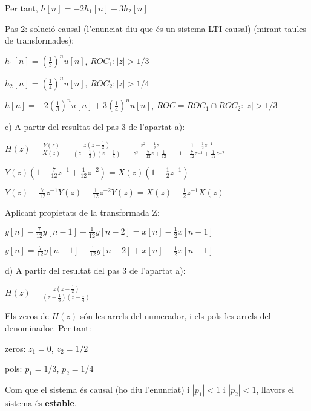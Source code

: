 \documentclass{article}
\begin{document}
\begin{description}
\begin{description}
Per tant, $h[n]=-2h_1[n]+3h_2[n]$

\item{Pas 2:}   solució causal (l'enunciat diu que és un sistema LTI causal) (mirant taules de transformades):

$
\displaystyle
h_1[n]=\left(\frac{1}{3}\right)^n u[n]
$, $ROC_1:|z|>1/3$

$
\displaystyle
h_2[n]=\left( \frac{1}{4} \right)^n u[n]
$, $ROC_2:|z|>1/4$

$
\displaystyle
h[n]=-2 \left(\frac{1}{3}\right)^n u[n] + 3 \left( \frac{1}{4} \right)^n u[n]
$, $ROC=ROC_1 \cap ROC_2:|z|>1/3$

\end{description}

\item{c)} A partir del resultat del pas 3 de l'apartat a):

$
\displaystyle
H(z)=\frac{Y(z)}{X(z)}= \frac{z(z-\frac{1}{2})}{(z-\frac{1}{3})(z-\frac{1}{4})}=\frac{z^2-\frac{1}{2}z}{z^2-\frac{7}{12}z+\frac{1}{12}}=
\frac{1-\frac{1}{2}z^{-1}}{1-\frac{7}{12}z^{-1}+\frac{1}{12}z^{-2}}
$
 
$
\displaystyle
Y(z) \left( 1-\frac{7}{12}z^{-1}+\frac{1}{12}z^{-2} \right) = X(z) \left(  1-\frac{1}{2}z^{-1} \right)
$

$
\displaystyle
Y(z) -\frac{7}{12}z^{-1} Y(z) +\frac{1}{12}z^{-2} Y(z)  = X(z) -\frac{1}{2}z^{-1} X(z)
$

Aplicant propietats de la transformada Z:

$
\displaystyle
y[n] -\frac{7}{12} y[n-1] +\frac{1}{12} y[n-2]  = x[n] -\frac{1}{2} x[n-1]
$

$
\displaystyle
y[n]= \frac{7}{12} y[n-1] - \frac{1}{12} y[n-2]  + x[n] -\frac{1}{2} x[n-1]
$


\item{d)} A partir del resultat del pas 3 de l'apartat a):

$
\displaystyle
H(z)= \frac{z(z-\frac{1}{2})}{(z-\frac{1}{3})(z-\frac{1}{4})}
$
 
Els zeros de $H(z)$ són les arrels del numerador, i els pols les arrels del denominador. Per tant:

zeros: $z_1=0$, $z_2=1/2$

pols: $p_1=1/3$, $p_2=1/4$


Com que el sistema és causal (ho diu l'enunciat) i $|p_1|<1$ i $|p_2|<1$, llavors el sistema és \textbf{estable}.

\end{description}
\end{document}
